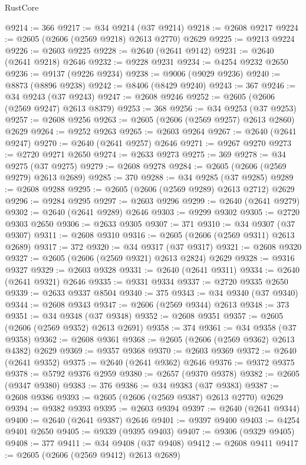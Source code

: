 \begin{lexlean}{RustCore}
\begin{coremodule}
@9214 := 366
@9217 := @34 @9214 (@37 @9214)
@9218 := @2608 @9217
@9224 := @2605 (@2606 (@2569 @9218) @2613 @2770) @2629
@9225 := @9213 @9224
@9226 := @2603 @9225
@9228 := @2640 (@2641 @9142)
@9231 := @2640 (@2641 @9218) @2646
@9232 := @9228 @9231
@9234 := @4254 @9232 @2650
@9236 := @9137 (@9226 @9234)
@9238 := @9006 (@9029 @9236)
@9240 := @8873 (@8896 @9238)
@9242 := @8406 (@8429 @9240)
@9243 := 367
@9246 := @34 @9243 (@37 @9243)
@9247 := @2608 @9246
@9252 := @2605 (@2606 (@2569 @9247) @2613 @8379)
@9253 := 368
@9256 := @34 @9253 (@37 @9253)
@9257 := @2608 @9256
@9263 := @2605 (@2606 (@2569 @9257) @2613 @2860) @2629
@9264 := @9252 @9263
@9265 := @2603 @9264
@9267 := @2640 (@2641 @9247)
@9270 := @2640 (@2641 @9257) @2646
@9271 := @9267 @9270
@9273 := @2720 @9271 @2650
@9274 := @2633 @9273
@9275 := 369
@9278 := @34 @9275 (@37 @9275)
@9279 := @2608 @9278
@9284 := @2605 (@2606 (@2569 @9279) @2613 @2689)
@9285 := 370
@9288 := @34 @9285 (@37 @9285)
@9289 := @2608 @9288
@9295 := @2605 (@2606 (@2569 @9289) @2613 @2712) @2629
@9296 := @9284 @9295
@9297 := @2603 @9296
@9299 := @2640 (@2641 @9279)
@9302 := @2640 (@2641 @9289) @2646
@9303 := @9299 @9302
@9305 := @2720 @9303 @2650
@9306 := @2633 @9305
@9307 := 371
@9310 := @34 @9307 (@37 @9307)
@9311 := @2608 @9310
@9316 := @2605 (@2606 (@2569 @9311) @2613 @2689)
@9317 := 372
@9320 := @34 @9317 (@37 @9317)
@9321 := @2608 @9320
@9327 := @2605 (@2606 (@2569 @9321) @2613 @2824) @2629
@9328 := @9316 @9327
@9329 := @2603 @9328
@9331 := @2640 (@2641 @9311)
@9334 := @2640 (@2641 @9321) @2646
@9335 := @9331 @9334
@9337 := @2720 @9335 @2650
@9339 := @2633 @9337 @8504
@9340 := 375
@9343 := @34 @9340 (@37 @9340)
@9344 := @2608 @9343
@9347 := @2606 (@2569 @9344) @2613
@9348 := 373
@9351 := @34 @9348 (@37 @9348)
@9352 := @2608 @9351
@9357 := @2605 (@2606 (@2569 @9352) @2613 @2691)
@9358 := 374
@9361 := @34 @9358 (@37 @9358)
@9362 := @2608 @9361
@9368 := @2605 (@2606 (@2569 @9362) @2613 @4382) @2629
@9369 := @9357 @9368
@9370 := @2603 @9369
@9372 := @2640 (@2641 @9352)
@9375 := @2640 (@2641 @9362) @2646
@9376 := @9372 @9375
@9378 := @5792 @9376 @2959
@9380 := @2657 (@9370 @9378)
@9382 := @2605 (@9347 @9380)
@9383 := 376
@9386 := @34 @9383 (@37 @9383)
@9387 := @2608 @9386
@9393 := @2605 (@2606 (@2569 @9387) @2613 @2770) @2629
@9394 := @9382 @9393
@9395 := @2603 @9394
@9397 := @2640 (@2641 @9344)
@9400 := @2640 (@2641 @9387) @2646
@9401 := @9397 @9400
@9403 := @4254 @9401 @2650
@9405 := @9339 (@9395 @9403)
@9407 := @9306 (@9329 @9405)
@9408 := 377
@9411 := @34 @9408 (@37 @9408)
@9412 := @2608 @9411
@9417 := @2605 (@2606 (@2569 @9412) @2613 @2689)

\end{coremodule}
\end{lexlean}
